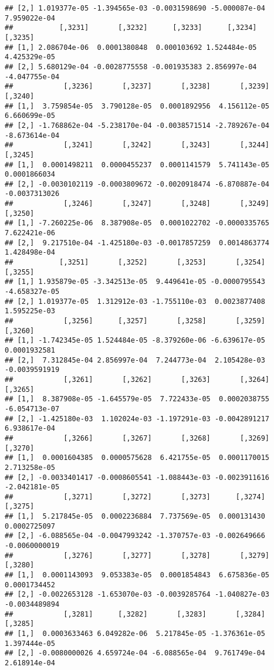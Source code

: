 \documentclass[
]{article}
\begin{document}
\begin{verbatim}
## [2,] 1.019377e-05 -1.394565e-03 -0.0031598690 -5.000087e-04  7.959022e-04
##           [,3231]       [,3232]      [,3233]      [,3234]       [,3235]
## [1,] 2.086704e-06  0.0001380848  0.000103692 1.524484e-05  4.425329e-05
## [2,] 5.680129e-04 -0.0028775558 -0.001935383 2.856997e-04 -4.047755e-04
##            [,3236]       [,3237]       [,3238]       [,3239]       [,3240]
## [1,]  3.759854e-05  3.790128e-05  0.0001892956  4.156112e-05  6.660699e-05
## [2,] -1.768862e-04 -5.238170e-04 -0.0038571514 -2.789267e-04 -8.673614e-04
##            [,3241]       [,3242]       [,3243]       [,3244]       [,3245]
## [1,]  0.0001498211  0.0000455237  0.0001141579  5.741143e-05  0.0001866034
## [2,] -0.0030102119 -0.0003809672 -0.0020918474 -6.870887e-04 -0.0037313026
##            [,3246]       [,3247]       [,3248]       [,3249]      [,3250]
## [1,] -7.260225e-06  8.387908e-05  0.0001022702 -0.0000335765 7.622421e-06
## [2,]  9.217510e-04 -1.425180e-03 -0.0017857259  0.0014863774 1.428498e-04
##           [,3251]       [,3252]       [,3253]       [,3254]       [,3255]
## [1,] 1.935879e-05 -3.342513e-05  9.449641e-05 -0.0000795543 -4.658327e-05
## [2,] 1.019377e-05  1.312912e-03 -1.755110e-03  0.0023877408  1.595225e-03
##            [,3256]      [,3257]       [,3258]       [,3259]       [,3260]
## [1,] -1.742345e-05 1.524484e-05 -8.379260e-06 -6.639617e-05  0.0001932581
## [2,]  7.312845e-04 2.856997e-04  7.244773e-04  2.105428e-03 -0.0039591919
##            [,3261]       [,3262]       [,3263]       [,3264]       [,3265]
## [1,]  8.387908e-05 -1.645579e-05  7.722433e-05  0.0002038755 -6.054713e-07
## [2,] -1.425180e-03  1.102024e-03 -1.197291e-03 -0.0042891217  6.938617e-04
##            [,3266]       [,3267]       [,3268]       [,3269]       [,3270]
## [1,]  0.0001604385  0.0000575628  6.421755e-05  0.0001170015  2.713258e-05
## [2,] -0.0033401417 -0.0008605541 -1.088443e-03 -0.0023911616 -2.042181e-05
##            [,3271]       [,3272]       [,3273]      [,3274]       [,3275]
## [1,]  5.217845e-05  0.0002236884  7.737569e-05  0.000131430  0.0002725097
## [2,] -6.088565e-04 -0.0047993242 -1.370757e-03 -0.002649666 -0.0060000019
##            [,3276]       [,3277]       [,3278]       [,3279]       [,3280]
## [1,]  0.0001143093  9.053383e-05  0.0001854843  6.675836e-05  0.0001734452
## [2,] -0.0022653128 -1.653070e-03 -0.0039285764 -1.040827e-03 -0.0034489894
##            [,3281]      [,3282]       [,3283]       [,3284]      [,3285]
## [1,]  0.0003633463 6.049282e-06  5.217845e-05 -1.376361e-05 1.397444e-05
## [2,] -0.0080000026 4.659724e-04 -6.088565e-04  9.761749e-04 2.618914e-04

\end{verbatim}
\end{document}
